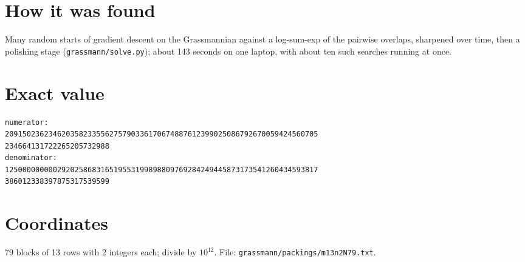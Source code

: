 \documentclass[11pt,a4paper]{article}
\begin{document}
\section{How it was found}
Many random starts of gradient descent on the Grassmannian against a log-sum-exp of the pairwise overlaps, sharpened over time, then a polishing stage (\texttt{grassmann/solve.py}); about 143 seconds on one laptop, with about ten such searches running at once.


\appendix
\section{Exact value}
{\small
\begin{verbatim}
numerator:
209150236234620358233556275790336170674887612399025086792670059424560705
234664131722265205732988
denominator:
125000000000292025868316519553199898809769284249445873173541260434593817
386012338397875317539599
\end{verbatim}}

\section{Coordinates}
79 blocks of 13 rows with 2 integers each; divide by $10^{12}$. File: \texttt{grassmann/packings/m13n2N79.txt}.
{\tiny
\begin{multicols}{4}
\end{multicols}}
\end{document}
